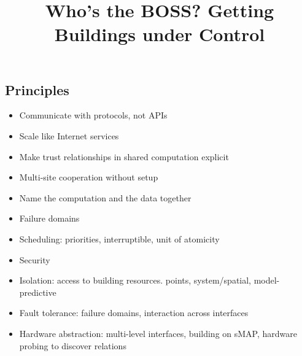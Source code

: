\documentclass[10pt,twocolumn,letterpaper]{article}
\title{Who's the BOSS? Getting Buildings under Control}
\begin{document}
\maketitle
\thispagestyle{empty}











\subsection{Principles}
\begin{itemize}
\item Communicate with protocols, not APIs
\item Scale like Internet services 
\item Make trust relationships in shared computation explicit
\item Multi-site cooperation without setup
\item Name the computation and the data together
\item Failure domains
\end{itemize}


\begin{itemize}
\item Scheduling: priorities, interruptible, unit of atomicity 
\item Security
\item Isolation: access to building resources. points, system/spatial, model-predictive
\item Fault tolerance: failure domains, interaction across interfaces
\item Hardware abstraction: multi-level interfaces, building on sMAP, hardware probing to discover relations
\end{itemize}
\end{document}
